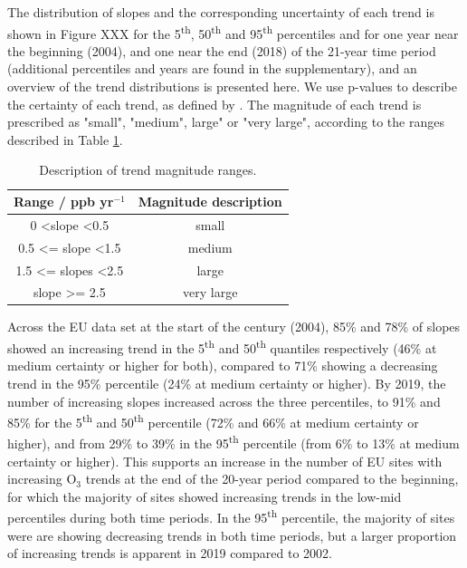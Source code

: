 \documentclass[journal abbreviation, manuscript]{copernicus}
\begin{document}
The distribution of slopes and the corresponding uncertainty of each trend is shown in Figure XXX for the 5\textsuperscript{th}, 50\textsuperscript{th} and 95\textsuperscript{th} percentiles and for one year near the beginning (2004), and one near the end (2018) of the 21-year time period (additional percentiles and years are found in the supplementary), and an overview of the trend distributions is presented here. We use p-values to describe the certainty of each trend, as defined by \cite{chang2023guidancenotebeststatistical}. The magnitude of each trend is prescribed as "small", "medium", large" or "very large", according to the ranges described in Table \ref{tab:magnitude_description_table}.

\begin{table}[h]
\caption{Description of trend magnitude ranges.}
\begin{tabular}{c|c}
Range / ppb yr$^{-1}$                 & Magnitude description \\ \hline
0 \textless slope \textless 0.5       & small                 \\
0.5 \textless{}= slope \textless 1.5  & medium              \\
1.5 \textless{}= slopes \textless 2.5 & large                 \\
slope \textgreater{}= 2.5             & very large           
\end{tabular}
\label{tab:magnitude_description_table}
\end{table}

Across the EU data set at the start of the century (2004), 85\% and 78\% of slopes showed an increasing trend in the 5\textsuperscript{th} and 50\textsuperscript{th} quantiles respectively (46\% at medium certainty or higher for both), compared to 71\% showing a decreasing trend in the 95\% percentile (24\% at medium certainty or higher). By 2019, the number of increasing slopes increased across the three percentiles, to 91\% and 85\% for the 5\textsuperscript{th} and 50\textsuperscript{th} percentile (72\% and 66\% at medium certainty or higher), and from 29\% to 39\% in the 95\textsuperscript{th} percentile (from 6\% to 13\% at medium certainty or higher). This supports an increase in the number of EU sites with increasing O$_3$ trends at the end of the 20-year period compared to the beginning, for which the majority of sites showed increasing trends in the low-mid percentiles during both time periods. In the 95\textsuperscript{th} percentile, the majority of sites were are showing decreasing trends in both time periods, but a larger proportion of increasing trends is apparent in 2019 compared to 2002. 
\end{document}
